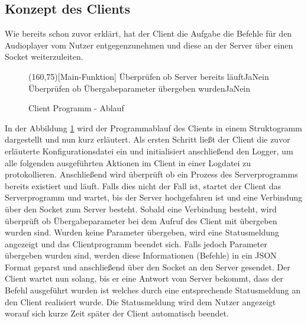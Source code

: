 \subsection{Konzept des Clients}
Wie bereits schon zuvor erklärt, hat der Client die Aufgabe die Befehle für den Audioplayer vom Nutzer entgegenzunehmen und diese an der Server über einen Socket weiterzuleiten.

\begin{figure}[H]
    \begin{struktogramm}(160,75)[Main-Funktion] 
         {Überprüfen ob Server bereits läuft}{Ja}{Nein} 
        	\change
        \ifend
         {Überprüfen ob Übergabeparameter übergeben wurden}{Ja}{Nein} 
            \whileend
            \change
        \ifend
    \end{struktogramm} 
\caption{Client Programm - Ablauf} 
\label{lst:client_ablauf} 
\end{figure}

In der Abbildung \ref{lst:client_ablauf} wird der Programmablauf des Clients in einem Struktogramm dargestellt und nun kurz erläutert. Als ersten Schritt ließt der Client die zuvor erläuterte Konfigurationsdatei ein und initialisiert anschließend den Logger, um alle folgenden ausgeführten Aktionen im Client in einer Logdatei zu protokollieren. Anschließend wird überprüft ob ein Prozess des Serverprogramms bereits existiert und läuft. Falls dies nicht der Fall ist, startet der Client das Serverprogramm und wartet, bis der Server hochgefahren ist und eine Verbindung über den Socket zum Server besteht. Sobald eine Verbindung besteht, wird überprüft ob Übergabeparameter bei dem Aufruf des Client mit übergeben wurden sind. Wurden keine Parameter übergeben, wird eine Statusmeldung angezeigt und das Clientprogramm beendet sich. Falls jedoch Parameter übergeben wurden sind, werden diese Informationen (Befehle) in ein \ac{JSON} Format geparst und anschließend über den Socket an den Server gesendet. Der Client wartet nun solang, bis er eine Antwort vom Server bekommt, dass der Befehl ausgeführt wurden ist welches durch eine entsprechende Statusmeldung an den Client realisiert wurde. Die Statusmeldung wird dem Nutzer angezeigt worauf sich kurze Zeit später der Client automatisch beendet.

